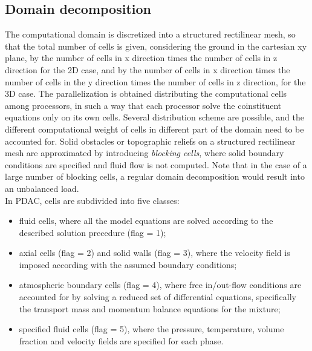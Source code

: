 \subsection{Domain decomposition}
The computational domain
is discretized into a structured rectilinear mesh, so that the total number
of cells is given, considering the ground in the cartesian xy plane,  
by the number of cells in x direction times the number of cells in z direction
for the 2D case, and by the number of cells in x direction times the number of cells 
in the y direction times the number of cells in z direction, for the 3D case.
The parallelization is obtained distributing the
computational cells among processors, in such a way that each processor solve
the coinstituent equations only on its own cells. 
Several distribution scheme are possible, and the different computational weight 
of cells in different part of the domain need to be accounted for.
Solid obstacles or topographic reliefs on a structured rectilinear mesh are 
approximated by introducing {\em blocking cells}, where solid boundary 
conditions are specified and fluid flow is not computed.
Note that in the case of a large number of blocking cells, 
a regular domain decomposition would result into an unbalanced load.\\
In PDAC, cells are subdivided into five classes:
\begin{itemize}
\item fluid cells, where all the model equations are solved according to the described solution precedure (flag = 1);
\item axial cells (flag = 2) and solid walls (flag = 3), where the velocity 
field is imposed according with the assumed boundary conditions; 
\item atmospheric boundary cells (flag = 4), where free in/out-flow 
conditions are accounted for by solving a reduced set of differential 
equations, specifically the transport mass and momentum balance equations 
for the mixture;
\item specified fluid cells (flag = 5), where the pressure, temperature, 
volume fraction and velocity fields are specified for each phase.
\end{itemize}

